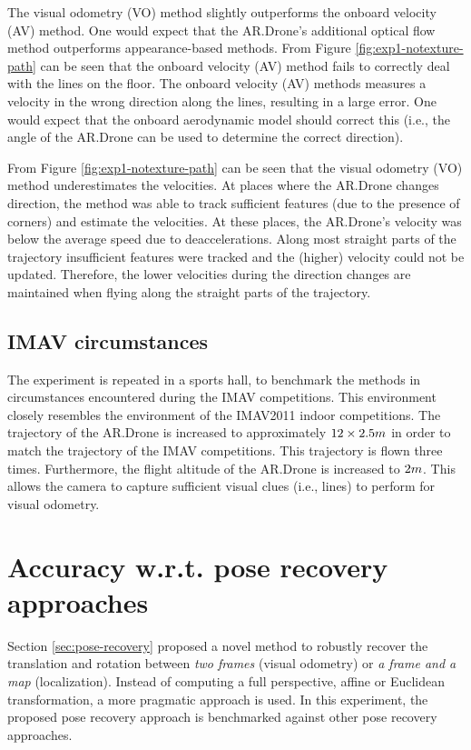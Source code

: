 The visual odometry (VO) method slightly outperforms the onboard velocity (AV) method.
One would expect that the AR.Drone's additional optical flow method outperforms appearance-based methods.
From Figure \ref{fig:exp1-notexture-path} can be seen that the onboard velocity (AV) method fails to correctly deal with the lines on the floor.
The onboard velocity (AV) methods measures a velocity in the wrong direction along the lines, resulting in a large error.
One would expect that the onboard aerodynamic model should correct this (i.e., the angle of the AR.Drone can be used to determine the correct direction).

From Figure \ref{fig:exp1-notexture-path} can be seen that the visual odometry (VO) method underestimates the velocities.
At places where the AR.Drone changes direction, the method was able to track sufficient features (due to the presence of corners) and estimate the velocities.
At these places, the AR.Drone's velocity was below the average speed due to deaccelerations.
Along most straight parts of the trajectory insufficient features were tracked and the (higher) velocity could not be updated.
Therefore, the lower velocities during the direction changes are maintained when flying along the straight parts of the trajectory.





\subsection{IMAV circumstances}
\label{sec:exp1-imav-circumstances}
The experiment is repeated in a sports hall, to benchmark the methods in circumstances encountered during the IMAV competitions.
This environment closely resembles the environment of the IMAV2011 indoor competitions.
The trajectory of the AR.Drone is increased to approximately $12 \times 2.5\small{m}$ in order to match the trajectory of the IMAV competitions.
This  trajectory is flown three times.
Furthermore, the flight altitude of the AR.Drone is increased to $2\begin{small}m\end{small}$.
This allows the camera to capture sufficient visual clues (i.e., lines) to perform for visual odometry.




\clearpage
\section{Accuracy w.r.t. pose recovery approaches}
\label{sec:results-pose-recovery}
Section \ref{sec:pose-recovery} proposed a novel method to robustly recover the translation and rotation between \textit{two frames} (visual odometry) or \textit{a frame and a map} (localization).
Instead of computing a full perspective, affine or Euclidean transformation, a more pragmatic approach is used.
In this experiment, the proposed pose recovery approach is benchmarked against other pose recovery approaches.

